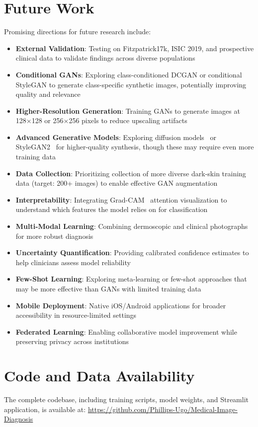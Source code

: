 \documentclass[10pt, twocolumn, letterpaper]{article}
\begin{document}
\section{Future Work}
Promising directions for future research include:
\begin{itemize}[leftmargin=*, itemsep=2pt]
    \item \textbf{External Validation}: Testing on Fitzpatrick17k, ISIC 2019, and prospective clinical data to validate findings across diverse populations
    \item \textbf{Conditional GANs}: Exploring class-conditioned DCGAN or conditional StyleGAN to generate class-specific synthetic images, potentially improving quality and relevance
    \item \textbf{Higher-Resolution Generation}: Training GANs to generate images at 128×128 or 256×256 pixels to reduce upscaling artifacts
    \item \textbf{Advanced Generative Models}: Exploring diffusion models~\cite{ho2020} or StyleGAN2~\cite{karras2020} for higher-quality synthesis, though these may require even more training data
    \item \textbf{Data Collection}: Prioritizing collection of more diverse dark-skin training data (target: 200+ images) to enable effective GAN augmentation
    \item \textbf{Interpretability}: Integrating Grad-CAM~\cite{selvaraju2017} attention visualization to understand which features the model relies on for classification
    \item \textbf{Multi-Modal Learning}: Combining dermoscopic and clinical photographs for more robust diagnosis
    \item \textbf{Uncertainty Quantification}: Providing calibrated confidence estimates to help clinicians assess model reliability
    \item \textbf{Few-Shot Learning}: Exploring meta-learning or few-shot approaches that may be more effective than GANs with limited training data
    \item \textbf{Mobile Deployment}: Native iOS/Android applications for broader accessibility in resource-limited settings
    \item \textbf{Federated Learning}: Enabling collaborative model improvement while preserving privacy across institutions
\end{itemize}

\section*{Code and Data Availability}
The complete codebase, including training scripts, model weights, and Streamlit application, is available at: \url{https://github.com/Phillips-Ugo/Medical-Image-Diagnosis}
\end{document}
